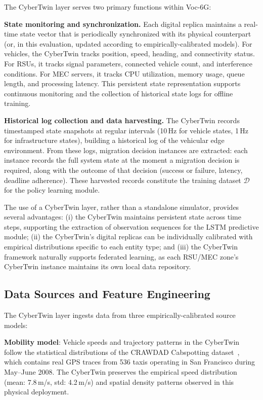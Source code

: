 \documentclass[10pt,letterpaper]{article}
\providecommand{\VocSixG}{Voc-6G}
\begin{document}
The CyberTwin layer serves two primary functions within \VocSixG{}:

\textbf{State monitoring and synchronization.} Each digital replica maintains a real-time state vector that is periodically synchronized with its physical counterpart (or, in this evaluation, updated according to empirically-calibrated models). For vehicles, the CyberTwin tracks position, speed, heading, and connectivity status. For RSUs, it tracks signal parameters, connected vehicle count, and interference conditions. For MEC servers, it tracks CPU utilization, memory usage, queue length, and processing latency. This persistent state representation supports continuous monitoring and the collection of historical state logs for offline training.

\textbf{Historical log collection and data harvesting.} The CyberTwin records timestamped state snapshots at regular intervals (10\,Hz for vehicle states, 1\,Hz for infrastructure states), building a historical log of the vehicular edge environment. From these logs, migration decision instances are extracted: each instance records the full system state at the moment a migration decision is required, along with the outcome of that decision (success or failure, latency, deadline adherence). These harvested records constitute the training dataset $\mathcal{D}$ for the policy learning module.

The use of a CyberTwin layer, rather than a standalone simulator, provides several advantages: (i) the CyberTwin maintains persistent state across time steps, supporting the extraction of observation sequences for the LSTM predictive module; (ii) the CyberTwin's digital replicas can be individually calibrated with empirical distributions specific to each entity type; and (iii) the CyberTwin framework naturally supports federated learning, as each RSU/MEC zone's CyberTwin instance maintains its own local data repository.

\subsection*{Data Sources and Feature Engineering}
\label{sec:data_sources}

The CyberTwin layer ingests data from three empirically-calibrated source models:

\textbf{Mobility model}: Vehicle speeds and trajectory patterns in the CyberTwin follow the statistical distributions of the CRAWDAD Cabspotting dataset~\cite{crawdad2009}, which contains real GPS traces from 536 taxis operating in San Francisco during May--June 2008. The CyberTwin preserves the empirical speed distribution (mean: 7.8\,m/s, std: 4.2\,m/s) and spatial density patterns observed in this physical deployment.
\end{document}
